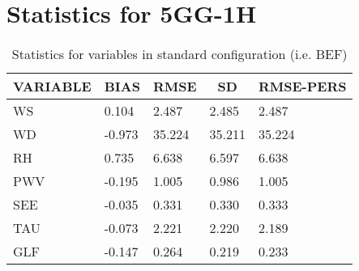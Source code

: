 \documentclass[11pt,english]{article}
\begin{document}
\section{Statistics for 5GG-1H}
\newpage
\begin{table}[]
\begin{center}
\begin{tabular}{|l|l|l|l|l|}
\hline
\multicolumn{1}{c|}{\cellcolor[HTML]{C0C0C0}\textbf{VARIABLE}} & \multicolumn{1}{c|}{\cellcolor[HTML]{C0C0C0}\textbf{BIAS}} & \multicolumn{1}{c|}{\cellcolor[HTML]{C0C0C0}\textbf{RMSE}} & \multicolumn{1}{c|}{\cellcolor[HTML]{C0C0C0}\textbf{SD}} & \multicolumn{1}{c|}{\cellcolor[HTML]{C0C0C0}\textbf{RMSE-PERS}}\\\hline
\cellcolor[HTML]{C0C0C0}WS  &     0.104                                &     2.487                                &     2.485  &     2.487 \\
\cellcolor[HTML]{C0C0C0}WD  &    -0.973                                &    35.224                                &    35.211  &    35.224 \\
\cellcolor[HTML]{C0C0C0}RH  &     0.735                                &     6.638                                &     6.597  &     6.638 \\
\cellcolor[HTML]{C0C0C0}PWV &    -0.195                               &     1.005                               &     0.986 &     1.005 \\
\cellcolor[HTML]{C0C0C0}SEE &    -0.035                               &     0.331                               &     0.330 &     0.333 \\
\cellcolor[HTML]{C0C0C0}TAU &    -0.073                               &     2.221                               &     2.220 &     2.189 \\
\cellcolor[HTML]{C0C0C0}GLF &    -0.147                               &     0.264                               &     0.219 &     0.233 \\
\hline
\end{tabular}
\caption{Statistics for variables in standard configuration (i.e. BEF)}
\end{center}
\end{table}
\newpage
\end{document}

